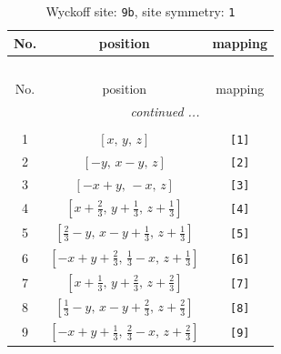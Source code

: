 \documentclass[fleqn,8pt]{jsarticle}
\begin{document}
\begin{longtable}{ccc}
\caption{Wyckoff site: {\tt 9b}, site symmetry: {\tt 1}}
 \\
 \hline \hline
No. & position & mapping \\ \hline \endfirsthead

\multicolumn{2}{l}{\tablename\ \thetable{}} \\
 \hline \hline
No. & position & mapping \\ \hline \endhead

 \hline \hline
\multicolumn{2}{r}{\footnotesize\it continued ...} \\ \endfoot

 \hline \hline
\multicolumn{2}{r}{} \\ \endlastfoot

1 & $\left[ x,\, y,\, z \right]$ & {\tt [1]} \\ \hline
2 & $\left[ - y,\, x - y,\, z \right]$ & {\tt [2]} \\ \hline
3 & $\left[ - x + y,\, - x,\, z \right]$ & {\tt [3]} \\ \hline
4 & $\left[ x + \frac{2}{3},\, y + \frac{1}{3},\, z + \frac{1}{3} \right]$ & {\tt [4]} \\ \hline
5 & $\left[ \frac{2}{3} - y,\, x - y + \frac{1}{3},\, z + \frac{1}{3} \right]$ & {\tt [5]} \\ \hline
6 & $\left[ - x + y + \frac{2}{3},\, \frac{1}{3} - x,\, z + \frac{1}{3} \right]$ & {\tt [6]} \\ \hline
7 & $\left[ x + \frac{1}{3},\, y + \frac{2}{3},\, z + \frac{2}{3} \right]$ & {\tt [7]} \\ \hline
8 & $\left[ \frac{1}{3} - y,\, x - y + \frac{2}{3},\, z + \frac{2}{3} \right]$ & {\tt [8]} \\ \hline
9 & $\left[ - x + y + \frac{1}{3},\, \frac{2}{3} - x,\, z + \frac{2}{3} \right]$ & {\tt [9]} \\
\end{longtable}
\end{document}
